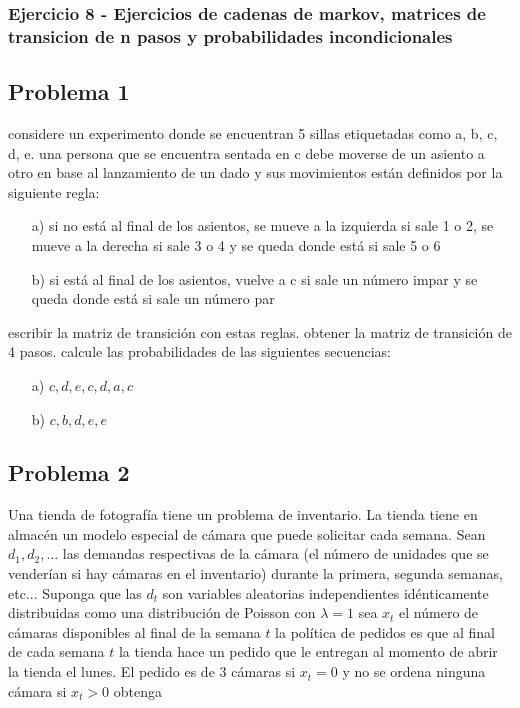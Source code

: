 \documentclass{article}
\begin{document}
\subsubsection{Ejercicio 8 - Ejercicios de cadenas de markov, matrices de transicion  de n pasos y probabilidades incondicionales}

\subsection*{Problema 1}

considere un experimento donde se encuentran 5 sillas etiquetadas como a, b, c, d, e. una persona que se encuentra sentada en c debe moverse de un asiento a otro en base al lanzamiento de un dado y sus movimientos están definidos por la siguiente regla:

\begin{itemize}
    \item[a)] si no está al final de los asientos, se mueve a la izquierda si sale 1 o 2, se mueve a la derecha si sale 3 o 4 y se queda donde está si sale 5 o 6
    \item[b)] si está al final de los asientos, vuelve a c si sale un número impar y se queda donde está si sale un número par
\end{itemize}

escribir la matriz de transición con estas reglas. obtener la matriz de transición de 4 pasos. calcule las probabilidades de las siguientes secuencias:

\begin{enumerate}
    \item[a)] \( c, d, e, c, d, a, c \)
    \item[b)] \( c, b, d, e, e \)
\end{enumerate}

\subsection*{Problema 2}

Una tienda de fotografía tiene un problema de inventario. La tienda tiene en almacén un modelo especial de cámara que puede solicitar cada semana. Sean \( d_1, d_2, \ldots \) las demandas respectivas de la cámara (el número de unidades que se venderían si hay cámaras en el inventario) durante la primera, segunda semanas, etc... Suponga que las \( d_t \) son variables aleatorias independientes idénticamente distribuidas como una distribución de Poisson con \( \lambda = 1 \) sea \( x_t \) el número de cámaras disponibles al final de la semana \( t \) la política de pedidos es que al final de cada semana \( t \) la tienda hace un pedido que le entregan al momento de abrir la tienda el lunes. El pedido es de 3 cámaras si \( x_t = 0 \) y no se ordena ninguna cámara si \( x_t > 0 \) obtenga
\end{document}
